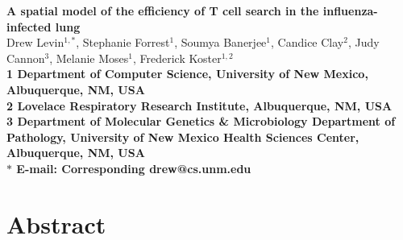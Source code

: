\documentclass[preprint,10pt,numbers]{elsarticle}
\date{}
\begin{document}
\begin{flushleft}
{\Large
\textbf{A spatial model of the efficiency of T cell search in the influenza-infected lung}
}
\\
Drew Levin$^{1,\ast}$, 
Stephanie Forrest$^{1}$, 
Soumya Banerjee$^{1}$,
Candice Clay$^{2}$, 
Judy Cannon$^{3}$,
Melanie Moses$^{1}$, 
Frederick Koster$^{1,2}$
\\
\bf{1} Department of Computer Science, University of New Mexico, Albuquerque, NM, USA
\\
\bf{2} Lovelace Respiratory Research Institute, Albuquerque, NM, USA
\\
\bf{3} Department of Molecular Genetics \& Microbiology Department of Pathology, University of New Mexico Health Sciences Center, Albuquerque, NM, USA
\\
$\ast$ E-mail: Corresponding drew@cs.unm.edu
\end{flushleft}



\section*{Abstract}


\end{document}
